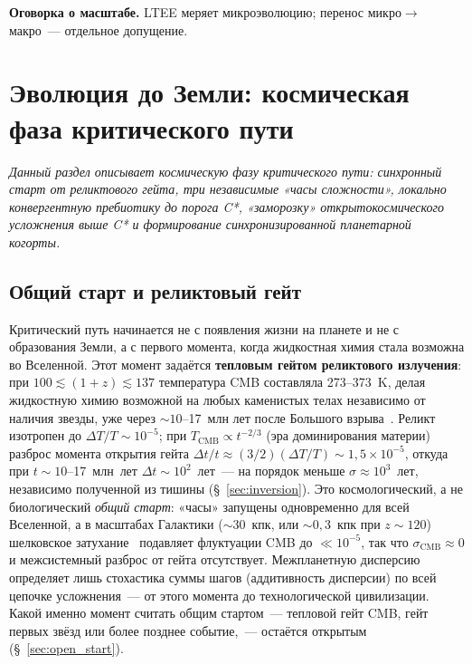 \documentclass[12pt,a4paper]{article}
\begin{document}
\textbf{Оговорка о масштабе.} LTEE меряет микроэволюцию; перенос микро$\to$макро~--- отдельное допущение.

\section{Эволюция до Земли: космическая фаза критического пути}
\label{sec:cosmic_ensemble}

\textit{Данный раздел описывает космическую фазу критического пути: синхронный старт от реликтового гейта, три независимые «часы сложности», локально конвергентную пребиотику до порога C*, «заморозку» открытокосмического усложнения выше C* и формирование синхронизированной планетарной когорты.}

\subsection{Общий старт и реликтовый гейт}
\label{sec:common_start}

Критический путь начинается не с появления жизни на планете и не с образования Земли, а с первого момента, когда жидкостная химия стала возможна во Вселенной. Этот момент задаётся \textbf{тепловым гейтом реликтового излучения}: при $100 \lesssim (1+z) \lesssim 137$ температура CMB составляла 273--373~K, делая жидкостную химию возможной на любых каменистых телах независимо от наличия звезды, уже через $\sim 10$--17~млн лет после Большого взрыва~\cite{Loeb2014}. Реликт изотропен до $\Delta T/T \sim 10^{-5}$; при $T_{\mathrm{CMB}} \propto t^{-2/3}$ (эра доминирования материи) разброс момента открытия гейта $\Delta t/t \approx (3/2)(\Delta T/T) \sim 1{,}5 \times 10^{-5}$, откуда при $t \sim 10$--17~млн~лет $\Delta t \sim 10^2$~лет~--- на порядок меньше $\sigma \approx 10^3$~лет, независимо полученной из тишины (\S~\ref{sec:inversion}). Это космологический, а не биологический \emph{общий старт}: «часы» запущены одновременно для всей Вселенной, а в масштабах Галактики ($\sim 30$~кпк, или $\sim 0{,}3$~кпк при $z\sim 120$) шелковское затухание~\cite{Silk1968} подавляет флуктуации CMB до $\ll 10^{-5}$, так что $\sigma_{\mathrm{CMB}} \approx 0$ и межсистемный разброс от гейта отсутствует. Межпланетную дисперсию определяет лишь стохастика суммы шагов (аддитивность дисперсии) по всей цепочке усложнения~--- от этого момента до технологической цивилизации. Какой именно момент считать общим стартом~--- тепловой гейт CMB, гейт первых звёзд или более позднее событие,~--- остаётся открытым (\S~\ref{sec:open_start}).
\end{document}
